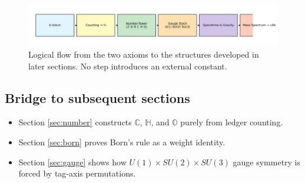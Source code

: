 \begin{figure}[t]
  \centering
  \includegraphics[width=\linewidth]{figs/axiom_flow.png}
  \caption{Logical flow from the two axioms to the structures developed
           in later sections.  No step introduces an external constant.}
  \label{fig:axiom-flow}
\end{figure}

\subsection{Bridge to subsequent sections}

\begin{itemize}
  \item Section \ref{sec:number} constructs $\mathbb C$, $\mathbb H$,
        and $\mathbb O$ purely from ledger counting.
  \item Section \ref{sec:born} proves Born's rule as a weight identity.
  \item Section \ref{sec:gauge} shows how $U(1)\!\times SU(2)\!\times SU(3)$
        gauge symmetry is forced by tag-axis permutations.
\end{itemize}

\clearpage
